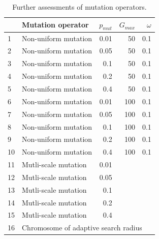 \documentclass[twocol]{ametsoc}
\begin{document}
\begin{table}[htbp]
	\caption{Further assessments of mutation operators.}
	\begin{center}
		\begin{tabular}{llrrr}
			\hline\hline  & \textbf{Mutation operator} & \textbf{$p_{mut}$} & \textbf{$G_{max}$} & \textbf{$\omega$}\\ 
			\hline 1 & Non-uniform mutation & 0.01 & 50 & 0.1 \\
			2 & Non-uniform mutation & 0.05 & 50 & 0.1 \\
			3 & Non-uniform mutation & 0.1 & 50 & 0.1 \\
			4 & Non-uniform mutation & 0.2 & 50 & 0.1 \\
			5 & Non-uniform mutation & 0.4 & 50 & 0.1 \\
			6 & Non-uniform mutation & 0.01 & 100 & 0.1 \\
			7 & Non-uniform mutation & 0.05 & 100 & 0.1 \\
			8 & Non-uniform mutation & 0.1 & 100 & 0.1 \\
			9 & Non-uniform mutation & 0.2 & 100 & 0.1 \\
			10 & Non-uniform mutation & 0.4 & 100 & 0.1 \\
			11 & Mutli-scale mutation &  0.01 &&\\
			12 & Mutli-scale mutation &  0.05 && \\
			13 & Mutli-scale mutation &  0.1 && \\
			14 & Mutli-scale mutation &  0.2 && \\
			15 & Mutli-scale mutation &  0.4 && \\
			16 & \multicolumn{4}{l}{Chromosome of adaptive search radius} \\
			\hline
		\end{tabular}
	\end{center}
	\label{tab:assessed_mutation_operators_bis}
\end{table}
\end{document}
